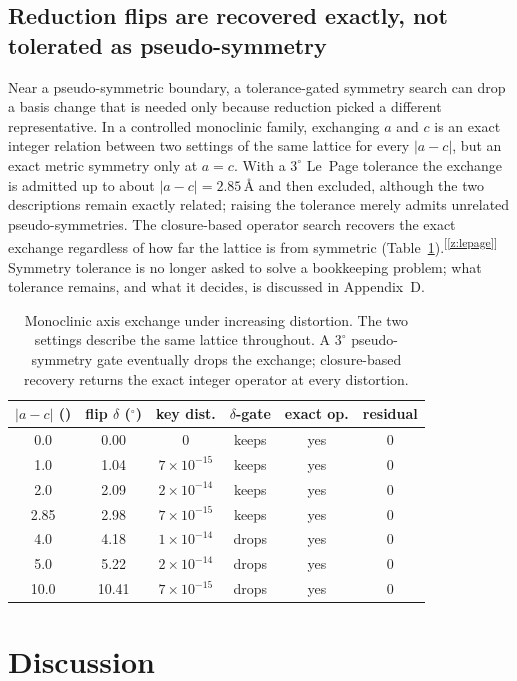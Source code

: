 \documentclass[11pt]{article}
\newcommand{\Ang}{\text{\AA}}
\newcommand{\chk}[1]{\textsuperscript{[\ref{#1}]}}
\begin{document}
\subsection{Reduction flips are recovered exactly, not tolerated as pseudo-symmetry}

Near a pseudo-symmetric boundary, a tolerance-gated symmetry search can drop a basis change that is needed only because reduction picked a different representative. In a controlled monoclinic family, exchanging $a$ and $c$ is an exact integer relation between two settings of the same lattice for every $|a-c|$, but an exact metric symmetry only at $a=c$. With a $3^\circ$ Le~Page tolerance the exchange is admitted up to about $|a-c|=2.85\,\Ang$ and then excluded, although the two descriptions remain exactly related; raising the tolerance merely admits unrelated pseudo-symmetries. The closure-based operator search recovers the exact exchange regardless of how far the lattice is from symmetric (Table~\ref{tab:flip}).\chk{z:lepage} Symmetry tolerance is no longer asked to solve a bookkeeping problem; what tolerance remains, and what it decides, is discussed in Appendix~D.

\begin{table}[t]
\centering
\caption{Monoclinic axis exchange under increasing distortion. The two settings describe the same lattice throughout. A $3^\circ$ pseudo-symmetry gate eventually drops the exchange; closure-based recovery returns the exact integer operator at every distortion.}
\label{tab:flip}
\begin{tabular}{cccccc}
\toprule
$|a-c|$ (\Ang) & flip $\delta$ ($^\circ$) & key dist. & $\delta$-gate & exact op. & residual \\
\midrule
0.0  & 0.00  & $0$ & keeps & yes & $0$ \\
1.0  & 1.04  & $7\times10^{-15}$ & keeps & yes & $0$ \\
2.0  & 2.09  & $2\times10^{-14}$ & keeps & yes & $0$ \\
2.85 & 2.98  & $7\times10^{-15}$ & keeps & yes & $0$ \\
4.0  & 4.18  & $1\times10^{-14}$ & drops & yes & $0$ \\
5.0  & 5.22  & $2\times10^{-14}$ & drops & yes & $0$ \\
10.0 & 10.41 & $7\times10^{-15}$ & drops & yes & $0$ \\
\bottomrule
\end{tabular}
\end{table}

\section{Discussion}
\end{document}
